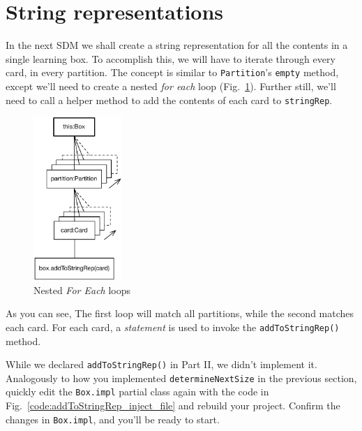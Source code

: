\newpage
\hypertarget{sec:stringRep}{}
\section{String representations}
\genHeader

In the next SDM we shall create a string representation for all the contents in a single learning box. To accomplish this, we will have to iterate through 
every card, in every partition. The concept is similar to \texttt{Partition}'s \texttt{empty} method, except we'll need to create a nested \emph{for each}
loop (Fig.~\ref{fig:goal_stringRep}). Further still, we'll need to call a helper method to add the contents of each card to \texttt{stringRep}.

\vspace{1cm}

\begin{figure}[htbp]
	\centering
	\includegraphics[width=0.3\textwidth]{goal_stringRep.pdf}
	\caption{Nested \emph{For Each} loops}
	\label{fig:goal_stringRep}
\end{figure}

\vspace{1cm}

As you can see, The first loop will match all partitions, while the second matches each card. For each card, a \emph{statement} is used to invoke the
\texttt{addToStringRep()} method.

\vspace{0.5cm}

While we declared \texttt{addToStringRep()} in Part II, we didn't implement it. Analogously to how you implemented \texttt{determineNextSize} in the
previous section, quickly edit the \texttt{Box.impl} partial class again with the code in Fig.~\ref{code:addToStringRep_inject_file} and rebuild your project.
Confirm the changes in \texttt{Box.impl}, and you'll be ready to start.

